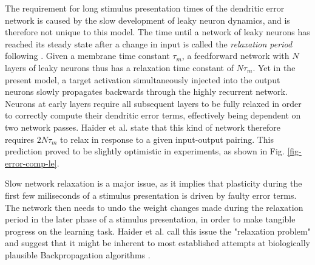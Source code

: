 The requirement for long stimulus presentation times of the dendritic error network is caused by the slow development of
leaky neuron dynamics, and is therefore not unique to this model. The time until a network of leaky neurons has reached
its steady state after a change in input is called the \textit{relaxation period} following \citep{Haider2021}. Given a
membrane time constant $\tau_m$, a feedforward network with $N$ layers of leaky neurons thus has a relaxation time
constant of $N \tau_m$. Yet in the present model, a target activation simultaneously injected into the output neurons
slowly propagates backwards through the highly recurrent network. Neurons at early layers require all subsequent layers
to be fully relaxed in order to correctly compute their dendritic error terms, effectively being dependent on two
network passes. Haider et al. state that this kind of network therefore requires $2N\tau_m$ to relax in response to a
given input-output pairing. This prediction proved to be slightly optimistic in experiments, as shown in Fig.
\ref{fig-error-comp-le}.


Slow network relaxation is a major issue, as it implies that plasticity during the first few miliseconds of a stimulus
presentation is driven by faulty error terms. The network then needs to undo the weight changes made during the
relaxation period in the later phase of a stimulus presentation, in order to make tangible progress on the learning
task. Haider et al. call this issue the "relaxation problem" and suggest that it might be inherent to most established
attempts at biologically plausible Backpropagation algorithms
\citep{Whittington2017,guerguiev2017towards,sacramento2018dendritic,millidge2020activation}.



